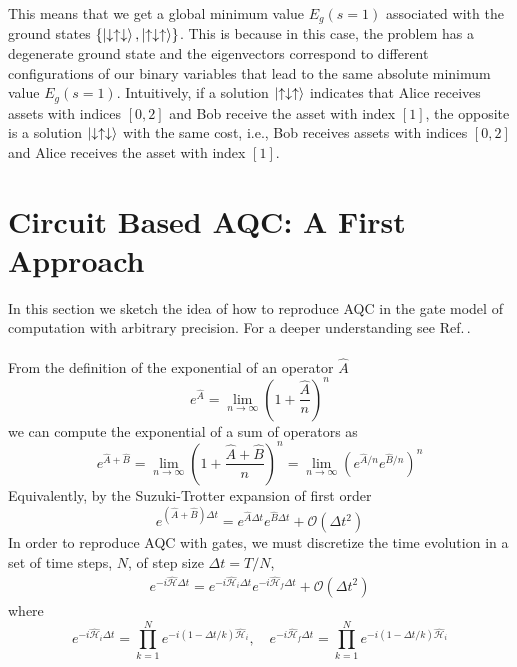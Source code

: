 This means that we get a global minimum value $E_{g}(s=1)$ associated with the ground states $\{\ket{\downarrow\uparrow\downarrow},\ket{\uparrow\downarrow\uparrow}\}$. This is because in this case, the problem has a degenerate ground state and the eigenvectors correspond to different configurations of our binary variables that lead to the same absolute minimum value $E_{g}(s=1)$. Intuitively, if a solution $\ket{\uparrow\downarrow\uparrow}$ indicates that Alice receives assets with indices $[0,2]$ and Bob receive the asset with index $[1]$, the opposite is a solution $\ket{\downarrow\uparrow\downarrow}$ with the same cost, i.e., Bob receives assets with indices $[0,2]$ and Alice receives the asset with index $[1]$.
\section{Circuit Based AQC: A First Approach}
In this section we sketch the idea of how to reproduce AQC in the gate model of computation with arbitrary precision. For a deeper understanding see Ref.\,\cite{Farhi2014AAlgorithm}.\\\\
From the definition of the exponential of an operator $\hat{A}$
\begin{equation}
    e^{\hat{A}}=\lim_{n\rightarrow \infty}\left( 1 + \frac{\hat{A}}{n}\right)^{n}
\end{equation}
we can compute the exponential of a sum of operators as
\begin{equation}
    e^{\hat{A}+\hat{B}}=\lim_{n\rightarrow \infty}\left( 1 + \frac{\hat{A} + \hat{B}}{n}\right)^{n} = \lim_{n\rightarrow \infty}\left(e^{\hat{A}/n}e^{\hat{B}/n}\right)^{n}
\end{equation}
Equivalently, by the Suzuki-Trotter expansion of first order 
\begin{equation}
        e^{\left(\hat{A}+\hat{B}\right)\Delta t} = e^{\hat{A}\Delta t}e^{\hat{B}\Delta t} + \mathcal{O}(\Delta t^{2})
\end{equation}
In order to reproduce AQC with gates, we must discretize the time evolution in a set of time steps, $N$, of step size $\Delta t = T/N$,
\begin{align}
    e^{-i\hat{\mathcal{H}}\Delta t} = e^{-i\hat{\mathcal{H}}_{i}\Delta t}e^{-i\hat{\mathcal{H}}_{f}\Delta t} + \mathcal{O}(\Delta t^{2})
\end{align}
where
\begin{equation}
    e^{-i\hat{\mathcal{H}}_{i}\Delta t} = \prod_{k=1}^{N}e^{-i\left(1-\Delta t/k\right)\hat{\mathcal{H}}_{i}}, \quad e^{-i\hat{\mathcal{H}}_{f}\Delta t} = \prod_{k=1}^{N}e^{-i\left(1-\Delta t/k\right)\hat{\mathcal{H}}_{i}}
\end{equation}
